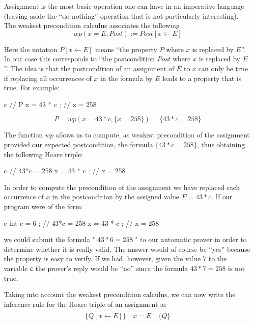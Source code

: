 


Assignment is the most basic operation one can have in an imperative
language (leaving aside the ``do nothing'' operation that is not particularly
interesting). The weakest precondition calculus associates the following
$$wp(x = E , Post) := Post[x \leftarrow E]$$


Here the notation $P[x \leftarrow E]$ means ``the property $P$ where
$x$ is replaced by $E$''. In our case this corresponds to ``the
postcondition $Post$ where $x$ is replaced by $E$''. The idea is
that the postcondition of an assignment of $E$ to $x$ can only be
true if replacing all occurrences of $x$ in the formula by $E$ leads
to a property that is true. For example:



\begin{CodeBlock}{c}
// { P }
x = 43 * c ;
// { x = 258 }
\end{CodeBlock}


$$P = wp(x = 43*c , \{x = 258\}) = \{43*c = 258\}$$


The function $wp$ allows us to compute, as weakest precondition of
the assignment provided our expected postcondition, the formula
$\{43*c = 258\}$, thus obtaining the following Hoare triple:


\begin{CodeBlock}{c}
// { 43*c = 258 }
x = 43 * c ;
// { x = 258 }
\end{CodeBlock}


In order to compute the precondition of the assignment we have replaced
each occurrence of $x$ in the postcondition by the assigned value
$E = 43*c$. If our program were of the form:



\begin{CodeBlock}{c}
int c = 6 ;
// { 43*c = 258 }
x = 43 * c ;
// { x = 258 }
\end{CodeBlock}



we could submit the formula " $43*6 = 258$ " to our automatic prover
in order to determine whether it is really valid. The answer would of
course be ``yes'' because the property is easy to verify. If we had,
however, given the value 7 to the variable \texttt{c} the prover's reply
would be ``no'' since the formula $43*7 = 258$ is not true.



Taking into account the weakest precondition calculus, we can now write
the inference rule for the Hoare triple of an assignment as
$$\dfrac{}{\{Q[x \leftarrow E] \}\quad x = E \quad\{ Q \}}$$


